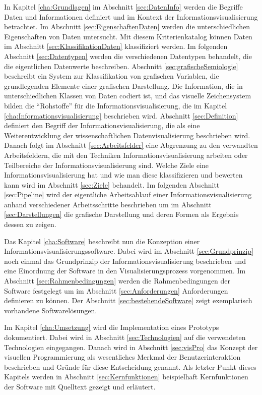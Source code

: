 \documentclass[a4paper, 12pt, DIVcalc, onepage, pdftex, headsepline, footsepline]{scrreprt}
\begin{document}
In Kapitel \ref{cha:Grundlagen} im Abschnitt \ref{sec:DatenInfo} werden die Begriffe Daten und
Informationen definiert und im Kontext der Informationsvisualisierung betrachtet.
Im Abschnitt \ref{sec:EigenschaftenDaten} werden die
unterschiedlichen Eigenschaften von Daten untersucht. Mit diesem Kriterienkatalog können Daten im
Abschnitt \ref{sec:KlassifikationDaten} klassifiziert werden.
Im folgenden Abschnitt \ref{sec:Datentypen} werden die verschiedenen Datentypen behandelt, die die eigentlichen
Datenwerte beschreiben.
Abschnitt \ref{sec:grafischeSemiologie} beschreibt ein System zur Klassifikation von grafischen Variablen,
die grundlegenden Elemente einer grafischen Darstellung.
Die Information, die in unterschiedlichen Klassen von Daten codiert ist, und das visuelle Zeichensystem bilden
die "`Rohstoffe"' für die Informationsvisualisierung, die im Kapitel \ref{cha:Informationsvisualisierung}
beschrieben wird. Abschnitt \ref{sec:Definition} definiert den Begriff
der Informationsvisualisierung, die als eine Weiterentwicklung der wissenschaftlichen
Datenvisualisierung beschrieben wird. Danach folgt im Abschnitt \ref{sec:Arbeitsfelder} eine Abgrenzung zu den verwandten
Arbeitsfeldern, die mit den Techniken Informationsvisualisierung arbeiten oder Teilbereiche der Informationsvisualisierung
sind. Welche Ziele eine Informationsvisualisierung hat und wie man diese klassifizieren und bewerten kann wird
im Abschnitt \ref{sec:Ziele} behandelt. Im folgenden Abschnitt \ref{sec:Pipeline} wird der eigentliche Arbeitsablauf
einer Informationsvisualisierung anhand verschiedener Arbeitsschritte beschrieben um im Abschnitt
\ref{sec:Darstellungen} die grafische Darstellung und deren Formen als Ergebnis dessen zu zeigen.

Das Kapitel \ref{cha:Software} beschreibt nun die Konzeption einer Informationsvisualisierungssoftware.
Dabei wird im Abschnitt \ref{sec:Grundprinzip} noch einmal das Grundprinzip der Informationsvisualisierung
beschrieben und eine Einordnung der Software in den Visualisierungsprozess vorgenommen.
Im Abschnitt \ref{sec:Rahmenbedingungen} werden die Rahmenbedingungen der Software festgelegt um im Abschnitt
\ref{sec:Anforderungen} Anforderungen definieren zu können. Der Abschnitt \ref{sec:bestehendeSoftware}
zeigt exemplarisch vorhandene Softwarelösungen.

Im Kapitel \ref{cha:Umsetzung} wird die Implementation eines Prototyps dokumentiert. Dabei wird in Abschnitt
\ref{sec:Technologien} auf die verwendeten Technologien eingegangen. Danach wird in Abschnitt
\ref{sec:visPro} das Konzept der visuellen Programmierung als wesentliches Merkmal der Benutzerinteraktion
beschrieben und Gründe für diese Entscheidung genannt.
Als letzter Punkt dieses Kapitels werden in Abschnitt \ref{sec:Kernfunktionen} beispielhaft Kernfunktionen
der Software mit Quelltext gezeigt und erläutert.
\end{document}
